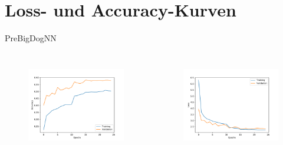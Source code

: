   \section{Loss- und Accuracy-Kurven}

  \begin{frame}[noframenumbering]
    \tableofcontents[currentsection]
  \end{frame}

  \begin{frame}{PreBigDogNN}
    \begin{columns}[c]
      \begin{figure}
        \centering
        \includegraphics[width=\textwidth]{logos/history_acc_prebig.pdf}
        \label{fig:acc_prebig}
      \end{figure}
      \begin{figure}
        \centering
        \includegraphics[width=\textwidth]{logos/history_loss_prebig.pdf}
        \label{fig:loss_prebig}
      \end{figure}
    \end{columns}
  \end{frame}

